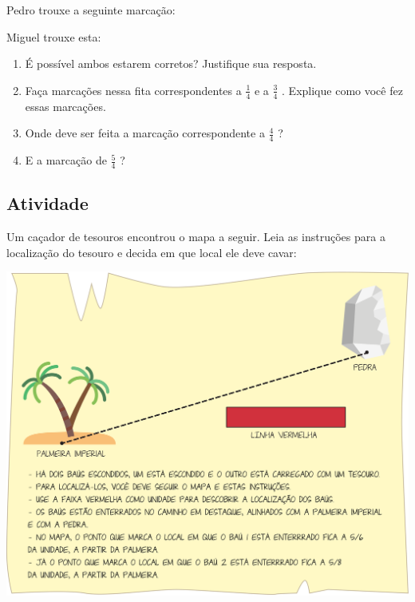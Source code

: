 Pedro trouxe a seguinte marcação: 

Miguel trouxe esta:

\begin{enumerate} [\quad a)] %
  \item     É possível ambos estarem corretos? Justifique sua resposta. 
  \item     Faça marcações nessa fita correspondentes a     $\frac{1}{4}$     e a     $\frac{3}{4}$    . Explique como você fez essas marcações.
  \item     Onde deve ser feita a marcação correspondente a     $\frac{4}{4}$    ?
  \item     E a marcação de     $\frac{5}{4}$    ? 
\end{enumerate} %
  
\subsection{Atividade}

Um caçador de tesouros encontrou o mapa a seguir. Leia as instruções para a localização do tesouro e decida em que local ele deve cavar:

\noindent\includegraphics[width=\textwidth, keepaspectratio]{..//media//cap3/secoes/png/ativ7_fig01.png}  

